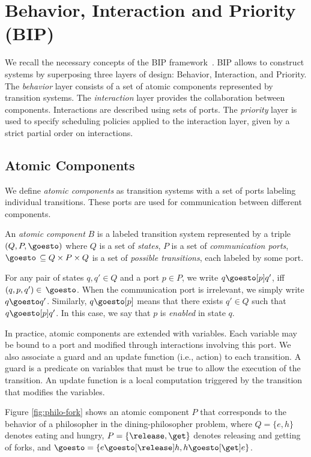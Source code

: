 \section{Behavior, Interaction and Priority (BIP)}
\label{sec:bip}
We recall the necessary concepts of the BIP framework~\cite{bip2}.
BIP allows to construct systems by superposing three layers of design: Behavior, Interaction, and Priority.
The \emph{behavior} layer consists of a set of atomic components represented by transition systems. 
The \emph{interaction} layer provides the collaboration between components. 
Interactions are described using sets of ports. 
The \emph{priority} layer is used to specify scheduling policies applied to the interaction layer, given by a strict partial order on interactions.

\subsection{Atomic Components}
We define \emph{atomic components} as transition systems with a set of ports labeling individual transitions. These ports are used for communication between different components.

\begin{definition}
An  {\em atomic component} $B$ is a labeled transition system represented by a triple $(Q,P,\goesto)$ where $Q$ is a set of {\em states}, $P$ is a set of {\em communication ports}, $\goesto\, \subseteq Q\times P\times Q$ is a set of {\em possible transitions}, each labeled by some port.
\end{definition}

For any pair of states $q,q'\in Q$ and a port $p\in P$, we write $q \goesto[p] q'$, iff $(q,p,q')\in\,\goesto$. When the communication port is irrelevant, we simply write $q \goesto q'$. Similarly, $q \goesto[p]$ means that there exists $q'\in Q$ such that $q \goesto[p] q'$. In this case, we say that $p$ is \emph{enabled} in state $q$.

In practice, atomic components are extended with variables. Each variable may be
bound to a port and modified through interactions involving this port. We also
associate a guard and an update function (i.e., action) to each transition. A guard is a
predicate on variables that must be true to allow the execution of the
transition. An update function is a local computation triggered by the
transition that modifies the variables. 

Figure \ref{fig:philo-fork} shows an atomic component $P$ that corresponds to the behavior of a philosopher in the dining-philosopher problem, where $Q = \{e,h\}$ denotes eating and hungry, $P = \{\release, \get\}$ denotes releasing and getting of forks, and $\goesto = \{e \goesto[\release] h, h \goesto[\get] e\}$.


